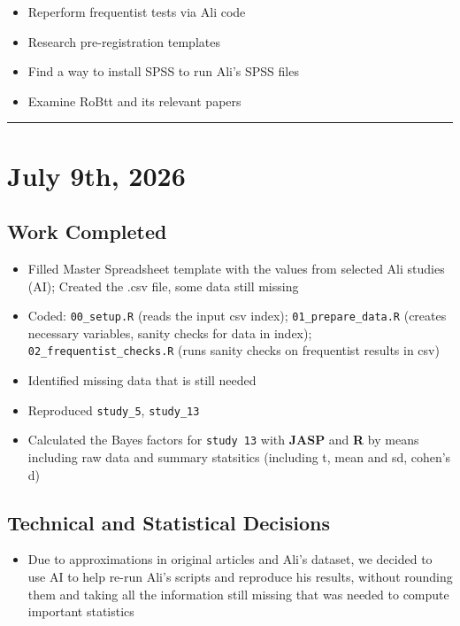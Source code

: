 \documentclass[11pt,a4paper]{article}
\newcommand{\entryseparator}{
  \vspace{1em} \noindent\rule{\textwidth}{0.4pt}
  \vspace*{-\baselineskip} 
}
\begin{document}
\begin{itemize}
    \item Reperform frequentist tests via Ali code 
    \item Research pre-registration templates
    \item Find a way to install SPSS to run Ali's SPSS files
    \item Examine RoBtt and its relevant papers
\end{itemize}

\entryseparator

\section{July 9th, 2026}

\subsection{Work Completed}

\begin{itemize}
    \item Filled Master Spreadsheet template with the values from selected Ali studies (AI); Created the .csv file, some data still missing
    \item Coded: \texttt{00_setup.R} (reads the input csv index); \texttt{01_prepare_data.R} (creates necessary variables, sanity checks for data in index); \texttt{02_frequentist_checks.R} (runs sanity checks on frequentist results in csv) 
    \item Identified missing data that is still needed
    \item Reproduced \texttt{study_5}, \texttt{study_13}
    \item Calculated the Bayes factors for \texttt{study 13} with \textbf{JASP} and \textbf{R} by means including raw data and summary statsitics (including t, mean and sd, cohen's d)
\end{itemize}

\subsection{Technical and Statistical Decisions}

\begin{itemize}
    \item Due to approximations in original articles and Ali's dataset, we decided to use AI to help re-run Ali's scripts and reproduce his results, without rounding them and taking all the information still missing that was needed to compute important statistics

\end{itemize}
\end{document}
